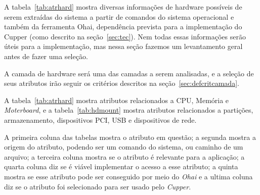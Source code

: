 A tabela~\ref{tab:atrhard} mostra diversas informações de hardware possíveis de serem extraídas
do sistema a partir de comandos do sistema operacional e também da ferramenta Ohai, 
dependência prevista para a implementação do Cupper (como descrito na 
seção~\ref{sec:tec}). Nem todas essas informações serão úteis para a 
implementação, mas nessa seção fazemos um levantamento geral antes de fazer uma
seleção.

A camada de hardware será uma das camadas a serem analisadas, e a seleção de 
seus atributos irão seguir os critérios descritos na seção~\ref{sec:defcritcamada}.

A tabela~\ref{tab:atrhard} mostra atributos relacionados a CPU, Memória e 
\textit{Moterboard}, e a tabela~\ref{tab:hdmount} mostra atributos relacionados
a partições, armazenamento, dispositivos PCI, USB e dispositivos de rede.

A primeira coluna das tabelas mostra o atributo em questão; a segunda mostra
a origem do atributo, podendo ser um comando do sistema, ou caminho de um arquivo;
a terceira coluna mostra se o atributo é relevante para a aplicação; a quarta
coluna diz se é viável implementar o acesso a esse atributo; a quinta mostra se
esse atributo pode ser conseguido por meio do \textit{Ohai} e a ultima coluna
diz se o atributo foi selecionado para ser usado pelo \textit{Cupper}.


